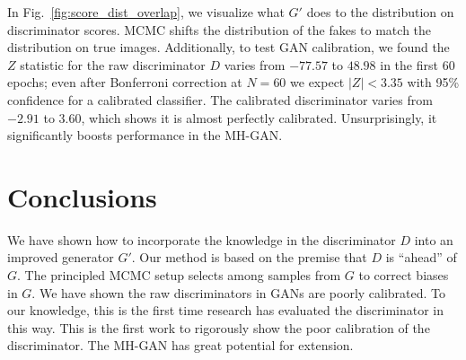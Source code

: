 \documentclass{article}
\begin{document}
In Fig.~\ref{fig:score_dist_overlap}, we visualize what $G'$ does to the distribution on discriminator scores.
MCMC shifts the distribution of the fakes to match the distribution on true images.
Additionally, to test GAN calibration, we found the $Z$ statistic for the raw discriminator $D$ varies from $-77.57$ to $48.98$ in the first 60 epochs; even after Bonferroni correction at $N \!\!=\!\! 60$ we expect $|Z| < 3.35$ with 95\% confidence for a calibrated classifier.
The calibrated discriminator varies from $-2.91$ to $3.60$, which shows it is almost perfectly calibrated.
Unsurprisingly, it significantly boosts performance in the MH-GAN\@.

\section{Conclusions}
\label{sec:conclusions}

We have shown how to incorporate the knowledge in the discriminator $D$ into an improved generator $G'$.
Our method is based on the premise that $D$ is ``ahead'' of $G$.
The principled MCMC setup selects among samples from $G$ to correct biases in $G$.
We have shown the raw discriminators in GANs are poorly calibrated.
To our knowledge, this is the first time research has evaluated the discriminator in this way.
This is the first work to rigorously show the poor calibration of the discriminator.
The MH-GAN has great potential for extension.  %


\end{document}
